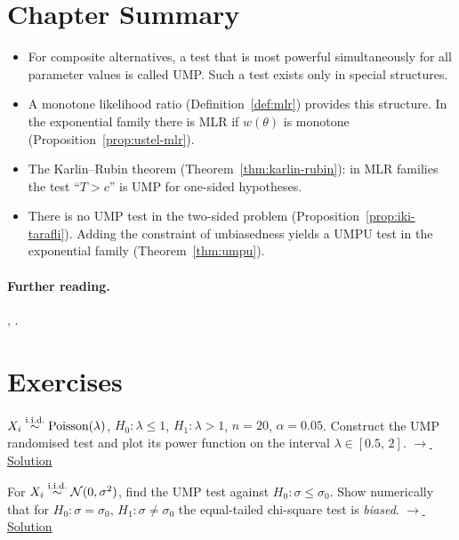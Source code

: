 \documentclass[main.tex]{subfiles}
\begin{document}
\section{Chapter Summary}
\begin{summary}
\begin{itemize}
  \item For composite alternatives, a test that is most powerful simultaneously for all parameter values is called UMP. Such a test exists only in special structures.
  \item A monotone likelihood ratio (Definition~\ref{def:mlr}) provides this structure. In the exponential family there is MLR if $w(\theta)$ is monotone (Proposition~\ref{prop:ustel-mlr}).
  \item The Karlin--Rubin theorem (Theorem~\ref{thm:karlin-rubin}): in MLR families the test ``$T>c$'' is UMP for one-sided hypotheses.
  \item There is no UMP test in the two-sided problem (Proposition~\ref{prop:iki-tarafli}). Adding the constraint of unbiasedness yields a UMPU test in the exponential family (Theorem~\ref{thm:umpu}).
\end{itemize}
\end{summary}

\paragraph{Further reading.} \cite[Section~8.3]{casella}, \cite[Chapters~3--4]{lehmann-romano}.

\section{Exercises}

\begin{exercise}\label{exr:14-1}
$X_i\overset{\text{i.i.d.}}{\sim}\text{Poisson}(\lambda)$, $H_0:\lambda\le1$, $H_1:\lambda>1$, $n=20$, $\alpha=0.05$. Construct the UMP randomised test and plot its power function on the interval $\lambda\in[0.5,\,2]$.
\hfill\hyperref[coz:14-1]{\footnotesize$\rightarrow$\,Solution}
\end{exercise}

\begin{exercise}\label{exr:14-2}
For $X_i\overset{\text{i.i.d.}}{\sim}\mathcal{N}(0,\sigma^2)$, find the UMP test against $H_0:\sigma\le\sigma_0$. Show numerically that for $H_0:\sigma=\sigma_0$, $H_1:\sigma\ne\sigma_0$ the equal-tailed chi-square test is \emph{biased}.
\hfill\hyperref[coz:14-2]{\footnotesize$\rightarrow$\,Solution}
\end{exercise}
\end{document}

